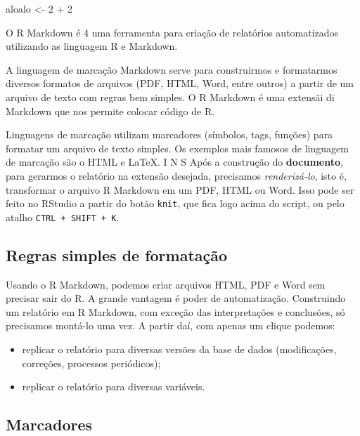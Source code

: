 \documentclass[
]{article}
\newenvironment{Shaded}{\begin{snugshade}}{\end{snugshade}}
\newcommand{\DecValTok}[1]{\textcolor[rgb]{0.00,0.00,0.81}{#1}}
\newcommand{\NormalTok}[1]{#1}
\newcommand{\OtherTok}[1]{\textcolor[rgb]{0.56,0.35,0.01}{#1}}
\newcommand{\SpecialCharTok}[1]{\textcolor[rgb]{0.00,0.00,0.00}{#1}}
\begin{document}
\begin{Shaded}
\begin{Highlighting}[]
\NormalTok{aloalo }\OtherTok{\textless{}{-}} \DecValTok{2} \SpecialCharTok{+} \DecValTok{2}
\end{Highlighting}
\end{Shaded}

O R Markdown é 4 uma ferramenta para criação de relatórios automatizados
utilizando as linguagem R e Markdown.

A linguagem de marcação Markdown serve para construirmos e formatarmos
diversos formatos de arquivos (PDF, HTML, Word, entre outros) a partir
de um arquivo de texto com regras bem simples. O R Markdown é uma
extensãi di Markdown que nos permite colocar código de R.

Linguagens de marcação utilizam marcadores (símbolos, tags, funções)
para formatar um arquivo de texto simples. Os exemplos mais famosos de
linguagem de marcação são o HTML e LaTeX. I N S Após a construção do
\textbf{documento}, para gerarmos o relatório na extensão desejada,
precisamos \emph{renderizá-lo}, isto é, transformar o arquivo R Markdown
em um PDF, HTML ou Word. Isso pode ser feito no RStudio a partir do
botão \texttt{knit}, que fica logo acima do script, ou pelo atalho
\texttt{CTRL\ +\ SHIFT\ +\ K}.

\hypertarget{regras-simples-de-formatauxe7uxe3o}{%
\subsection{Regras simples de
formatação}\label{regras-simples-de-formatauxe7uxe3o}}

Usando o R Markdown, podemos criar arquivos HTML, PDF e Word sem
precisar sair do R. A grande vantagem é poder de automatização.
Construindo um relatório em R Markdown, com exceção das interpretações e
conclusões, só precisamos montá-lo uma vez. A partir daí, com apenas um
clique podemos:

\begin{itemize}
\item
  replicar o relatório para diversas versões da base de dados
  (modificações, correções, processos periódicos);
\item
  replicar o relatório para diversas variáveis.
\end{itemize}

\hypertarget{marcadores}{%
\subsection{Marcadores}\label{marcadores}}
\end{document}
